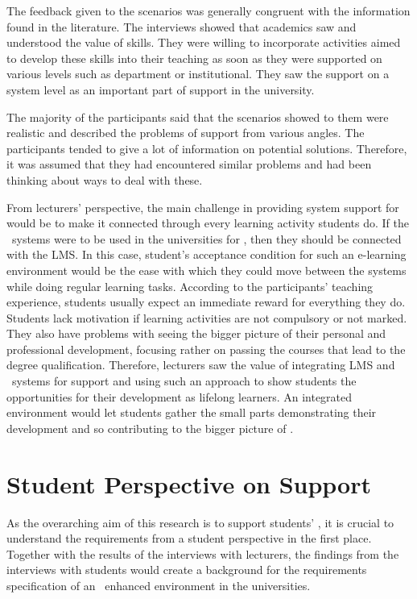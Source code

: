 The feedback given to the scenarios was generally congruent with the information
found in the literature. The interviews showed that academics saw and understood
the value of \LLLs skills. They were willing to incorporate activities aimed to
develop these skills into their teaching as soon as they were supported on
various levels such as department or institutional. They saw the support on a
system level as an important part of \LLLs support in the university.

The majority of the participants said that the scenarios showed to them were
realistic and described the problems of \LLLs support from various angles. The
participants tended to give a lot of information on potential solutions.
Therefore, it was assumed that they had encountered similar problems and had
been thinking about ways to deal with these.

From lecturers' perspective, the main challenge in providing system support for
\LLLs would be to make it connected through every learning activity students do.
If the \ep~systems were to be used in the universities for \LLLs, then they
should be connected with the LMS. In this case, student's acceptance condition
for such an e-learning environment would be the ease with which they could move
between the systems while doing regular learning tasks. According to the
participants' teaching experience, students usually expect an immediate reward
for everything they do. Students lack motivation if learning activities are not
compulsory or not marked. They also have problems with seeing the bigger picture
of their personal and professional development, focusing rather on passing the
courses that lead to the degree qualification. Therefore, lecturers saw the
value of integrating LMS and \ep~systems for \LLLs support and using such
an approach to show students the opportunities for their development as lifelong
learners. An integrated environment would let students gather the small parts
demonstrating their development and so contributing to the bigger picture of
\LLLsn.

\section{Student Perspective on \LLLc Support}

As the overarching aim of this research is to support students' \LLLsn, it is
crucial to understand the requirements from a student perspective in the first
place. Together with the results of the interviews with lecturers, the findings
from the interviews with students would create a background for the requirements
specification of an \ep~enhanced environment in the universities.

